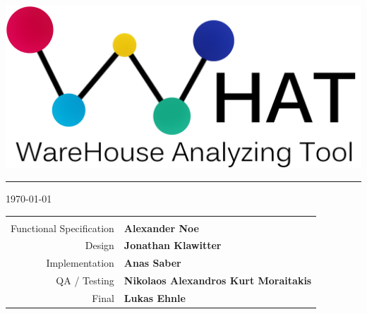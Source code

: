 \begin{titlepage}
\begin{center}
\begin{center}
   \includegraphics[width=0.7\linewidth]{Pictures/WHAT-LogoText2.png}
   
\end{center} 


\vspace*{2.8cm}

{\color{Bittersweet}\hrule}
\vspace*{0.4cm}
 {\today}
 
\vspace*{0.5cm}
\normalsize

 

\begin{tabular}{r l}

\arrayrulecolor{Bittersweet!90}
\hline
& \\
 
  	Functional Specification
&
	\textbf{Alexander Noe}
\\ 
	Design
& 
	\textbf{Jonathan Klawitter}
\\ 
	Implementation 
& 
	\textbf{Anas Saber}
\\
	QA / Testing 
&
	\textbf{Nikolaos Alexandros Kurt Moraitakis}
\\
	Final 
&	\textbf{Lukas Ehnle}\\



 
\end{tabular}


\end{center}
\end{titlepage}